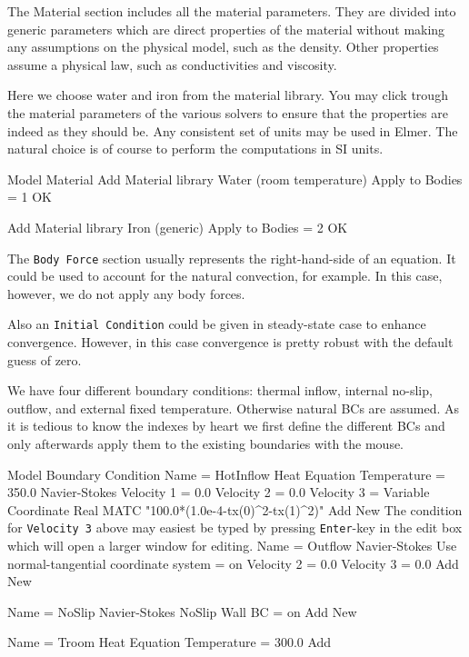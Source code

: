 The Material section includes all the material parameters.
They are divided into generic parameters which are direct properties of the material
without making any assumptions on the physical model, such as the density. Other properties assume
a physical law, such as conductivities and viscosity. 

Here we choose water and iron from the material library.
You may click trough the material parameters of the various solvers to ensure that
the properties are indeed as they should be. Any consistent set of units may be used in Elmer.
The natural choice is of course to perform the computations in SI units. 

\ttbegin
Model
  Material
    Add
    Material library    
      Water (room temperature)
    Apply to Bodies = 1 
    OK

    Add
    Material library    
      Iron (generic)
    Apply to Bodies = 2
    OK
\ttend

The \texttt{Body Force} section usually represents the right-hand-side of an equation. It could be used to account for the
natural convection, for example. In this case, however, we do not apply any body forces.

Also an \texttt{Initial Condition} could be given in steady-state case to enhance convergence. However,
in this case convergence is pretty robust with the default guess of zero.

We have four different boundary conditions: thermal inflow, internal no-slip, 
outflow, and external fixed temperature. Otherwise natural BCs are assumed.
As it is tedious to know the indexes by heart we 
first define the different BCs and only afterwards apply them to the existing boundaries 
with the mouse. 

\ttbegin
Model
  Boundary Condition
    Name = HotInflow
    Heat Equation
      Temperature = 350.0
    Navier-Stokes 
      Velocity 1 = 0.0
      Velocity 2 = 0.0
      Velocity 3 = Variable Coordinate 
        Real MATC "100.0*(1.0e-4-tx(0)^2-tx(1)^2)"
    Add
    New
\ttend
The condition for \texttt{Velocity 3} above may easiest be typed by pressing \texttt{Enter}-key in the
edit box which will open a larger window for editing.
\ttbegin
    Name = Outflow
    Navier-Stokes 
      Use normal-tangential coordinate system = on
      Velocity 2 = 0.0
      Velocity 3 = 0.0
    Add
    New

    Name = NoSlip
    Navier-Stokes 
      NoSlip Wall BC = on
    Add 
    New
 
    Name = Troom
    Heat Equation
      Temperature = 300.0
    Add
\ttend   

